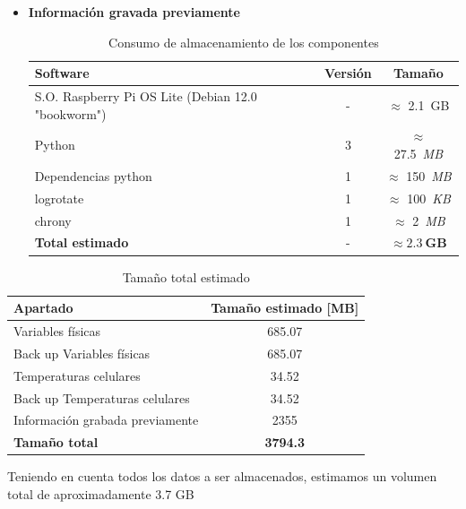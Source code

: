 \begin{itemize}
        \item \textbf{Información gravada previamente}

        \begin{table}[H]
        \centering
        \begin{tabular}{|l|c|c|}
        \hline
        \textbf{Software} & \textbf{Versión} & \textbf{Tamaño} \\
        \hline
        S.O. Raspberry Pi OS Lite (Debian 12.0 "bookworm") & - & $\approx$ 2.1~GB \\
        Python                   & 3 & $\approx$ 27.5~\textit{MB} \\
        Dependencias python      & 1 & $\approx$ 150~\textit{MB} \\
        logrotate                & 1 & $\approx$ 100~\textit{KB} \\
        chrony                   & 1 & $\approx$ 2~\textit{MB} \\
        \hline
        \textbf{Total estimado}  & - & $\boldsymbol{\approx 2.3~GB}$ \\
        \hline
        \end{tabular}
        \caption{Consumo de almacenamiento de los componentes}
        \label{tab:almacenamiento_componentes}
        \end{table}
    
      \end{itemize}

      \begin{table}[H]
      \centering
      \begin{tabular}{|l|c|}
      \hline
      \textbf{Apartado} & \textbf{Tamaño estimado [MB]} \\
      \hline
      Variables físicas              & 685.07 \\
      Back up Variables físicas      & 685.07 \\
      Temperaturas celulares         & 34.52  \\
      Back up Temperaturas celulares & 34.52  \\
      Información grabada previamente & 2355 \\
      \hline
      \textbf{Tamaño total}          & \textbf{3794.3} \\
      \hline
      \end{tabular}
      \caption{Tamaño total estimado}
      \label{tab:tamano_total_estimado}
      \end{table}

      Teniendo en cuenta todos los datos a ser almacenados, estimamos un volumen total de
      aproximadamente 3.7 GB

